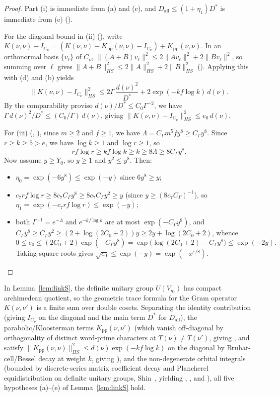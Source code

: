 \documentclass[11pt]{amsart}
\newcommand{\eps}{\varepsilon}
\theoremstyle{plain}
\theoremstyle{definition}
\numberwithin{equation}{section}
\begin{document}
\begin{proof}
Part (i) is immediate from (a) and (c), and $D_{\mathrm{all}}\le(1+\eta_1)D^\ast$ is immediate
from (e) ().

For the diagonal bound in (ii) (), write
$K(\nu,\nu)-I_{C_\nu}=(K(\nu,\nu)-K_{\mathrm{pp}}(\nu,\nu)-I_{C_\nu})+K_{\mathrm{pp}}(\nu,\nu)$.
In an orthonormal basis $\{v_\ell\}$ of $C_\nu$,
$\|(A+B)v_\ell\|^2\le 2\|Av_\ell\|^2+2\|Bv_\ell\|^2$, so summing over $\ell$ gives
$\|A+B\|_{HS}^2\le 2\|A\|_{HS}^2+2\|B\|_{HS}^2$ (). Applying this with (d)
and (b) yields
\[
\|K(\nu,\nu)-I_{C_\nu}\|_{HS}^2
\le 2\Gamma\,\frac{d(\nu)^2}{D^\ast}+2\exp(-kf\log k)\,d(\nu).
\]
By the comparability proviso $d(\nu)/D^\ast\le C_0\Gamma^{-2}$, we have
$\Gamma\,d(\nu)^2/D^\ast\le (C_0/\Gamma)\,d(\nu)$, giving $\|K(\nu,\nu)-I_{C_\nu}\|_{HS}^2\le e_0\,d(\nu)$.

For (iii) (, ), since $m\ge 2$ and $f\ge 1$,
we have $\Lambda=C_\Gamma m^5 f y^8\ge C_\Gamma y^8$. Since $r\ge k\ge 5>e$, we have
$\log k\ge 1$ and $\log r\ge 1$, so
\[
r f\log r\ge k f\log k\ge k\ge 8\Lambda\ge 8 C_\Gamma y^8.
\]
Now assume $y\ge Y_0$, so $y\ge 1$ and $y^2\le y^8$. Then:
\begin{itemize}
\item $\eta_0=\exp(-6y^8)\le\exp(-y)$ since $6y^8\ge y$;
\item $c_7 r f\log r\ge 8 c_7 C_\Gamma y^8\ge 8 c_7 C_\Gamma y^2\ge y$ (since
  $y\ge(8c_7 C_\Gamma)^{-1}$), so $\eta_1=\exp(-c_7 r f\log r)\le\exp(-y)$;
\item both $\Gamma^{-1}=e^{-\Lambda}$ and $e^{-kf\log k}$ are at most $\exp(-C_\Gamma y^8)$, and
  $C_\Gamma y^8\ge C_\Gamma y^2\ge(2+\log(2C_0+2))y\ge 2y+\log(2C_0+2)$, whence
  \[
  0\le e_0\le(2C_0+2)\exp(-C_\Gamma y^8)=\exp\bigl(\log(2C_0+2)-C_\Gamma y^8\bigr)\le\exp(-2y).
  \]
  Taking square roots gives $\sqrt{e_0}\le\exp(-y)=\exp(-x^{\eps/8})$. \qedhere
\end{itemize}
\end{proof}

\noindent In Lemma~\ref{lem:linkS}, the definite unitary group $U(V_m)$ has compact archimedean
quotient, so the geometric trace formula for the Gram operator $K(\nu,\nu')$ is a finite sum over
double cosets. Separating the identity contribution (giving $I_{C_\nu}$ on the diagonal and the
main term $D^\ast$ for $D_{\mathrm{all}}$), the parabolic/Kloosterman terms $K_{\mathrm{pp}}(\nu,\nu')$
(which vanish off-diagonal by orthogonality of distinct word-prime characters at $T(\nu)\neq T(\nu')$,
giving , and satisfy $\|K_{\mathrm{pp}}(\nu,\nu)\|_{HS}^2\le d(\nu)\exp(-kf\log k)$
on the diagonal by Bruhat-cell/Bessel decay at weight $k$, giving ), and the
non-degenerate orbital integrals (bounded by discrete-series matrix coefficient decay and
Plancherel equidistribution on definite unitary groups, Shin~\cite[Thms.~4.11--4.12]{shin-plancherel},
yielding , , and ), all five hypotheses (a)--(e) of
Lemma~\ref{lem:linkS} hold.
\end{document}
